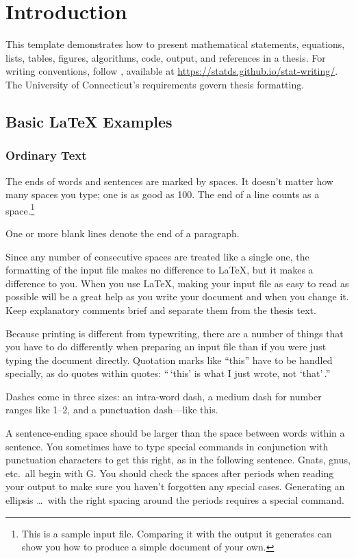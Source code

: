 \chapter{Introduction}
\label{introduction}


This template demonstrates how to present mathematical statements, equations,
lists, tables, figures, algorithms, code, output, and references in a thesis.
For writing conventions, follow \citet{schifano2026statistical}, available at
\url{https://statds.github.io/stat-writing/}. The University of Connecticut's
requirements govern thesis formatting.


\section{Basic LaTeX Examples}


\subsection{Ordinary Text}


The ends of words and sentences are marked by spaces. It doesn't matter how
many spaces you type; one is as good as 100. The end of a line counts as a
space.\footnote{ This is a sample input file. Comparing it with the output it
generates can show you how to produce a simple document of your own. }


One or more blank lines denote the end of a paragraph.


Since any number of consecutive spaces are treated like a single one, the
formatting of the input file makes no difference to \LaTeX, but it makes a
difference to you. When you use \LaTeX, making your input file as easy to read
as possible will be a great help as you write your document and when you change
it. Keep explanatory comments brief and separate them from the thesis text.


Because printing is different from typewriting, there are a number of things
that you have to do differently when preparing an input file than if you were
just typing the document directly. Quotation marks like ``this'' have to be
handled specially, as do quotes within quotes: ``\,`this' is what I just wrote,
not `that'\,.''


Dashes come in three sizes: an intra-word dash, a medium dash for number ranges
like 1--2, and a punctuation dash---like this.


A sentence-ending space should be larger than the space between words within a
sentence. You sometimes have to type special commands in conjunction with
punctuation characters to get this right, as in the following sentence. Gnats,
gnus, etc.\ all begin with G\@. You should check the spaces after periods when
reading your output to make sure you haven't forgotten any special cases.
Generating an ellipsis \ldots\ with the right spacing around the periods
requires a special command.



